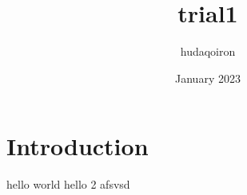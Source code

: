 \documentclass{article}
\title{trial1}
\author{hudaqoiron }
\date{January 2023}
\begin{document}
\maketitle

\section{Introduction}
hello world 
hello 2 afsvsd
\end{document}
